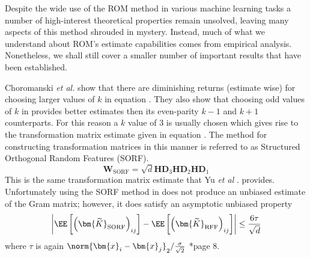 Despite the wide use of the ROM method in various machine learning tasks \cite{ChoromanskiKrzysztof2017TUEo,AndoniAlexandr2015PaOL,ChoromanskiKrzysztof2020RAwP,LiuFanghui2021RFfK} a number of high-interest theoretical properties remain unsolved, leaving many aspects of this method shrouded in mystery. Instead, much of what we understand about ROM's estimate capabilities comes from empirical analysis. Nonetheless, we shall still cover a smaller number of important results that have been established.

Choromanski {\it et al.} \cite{ChoromanskiKrzysztof2017TUEo} show that there are diminishing returns (estimate wise) for choosing larger values of $k$ in equation  . They also show that choosing odd values of $k$ in   provides better estimates then its even-parity $k-1$ and $k+1$ counterparts. For this reason a $k$ value of $3$ is usually chosen which gives rise to the transformation matrix estimate given in equation  . The method for constructing transformation matrices in this manner is referred to as Structured Orthogonal Random Features (SORF).
\begin{equation} \label{eq: SORF-tm}
    \bm{W}_{\text{SORF}} = \sqrt{d} \bm{H} \bm{D}_{3} \bm{H} \bm{D}_{2} \bm{H} \bm{D}_{1}
\end{equation}
This is the same transformation matrix estimate that Yu {\it et al} \cite{YuFelixX2016ORF}. provides. Unfortunately using the SORF method in  does not produce an unbiased estimate of the Gram matrix; however, it does satisfy an asymptotic unbiased property
\begin{equation*}
    \left| \EE \left[ \left( \bm{\widetilde{K}}_{\text{SORF}} \right)_{ij} \right] - \EE \left[ \left( \bm{\widetilde{K}}_{\text{RFF}} \right)_{ij} \right] \right| \leq \frac{6 \tau}{\sqrt{d}}
\end{equation*}
where $\tau$ is again $\norm{\bm{x}_i - \bm{x}_j}_2 / \frac{\sigma}{\sqrt{2}}$ \cite{LiuFanghui2021RFfK}*{page 8}.

